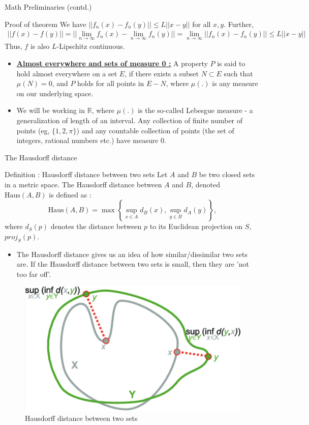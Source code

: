 \documentclass[8pt,aspectratio=169]{beamer}
\begin{document}
\begin{frame}[fragile]{Math Preliminaries (contd.)}
    \begin{block}{Proof of theorem}
        We have $||f_n(x) - f_n(y)|| \leq L||x-y||$ for all $x, y$. Further,
        \begin{align*}
            ||f(x) - f(y)|| = ||\lim_{n\to\infty} f_n(x) - \lim_{n\to\infty}f_n(y)|| = \lim_{n\to \infty}||f_n(x) - f_n(y)|| \leq L||x-y||
        \end{align*}
        Thus, $f$ is also $L$-Lipschitz continuous.
        
    \end{block}
    \begin{itemize}
        \item \textbf{\underline{Almost everywhere and sets of measure 0 :}} A property $P$ is said to hold almost everywhere on a set $E$, if there exists a subset $N \subset E$ such that $\mu(N) = 0$, and $P$ holds for all points in $E-N$, where $\mu(.)$ is any measure on our underlying space.

        \item We will be working in $\mathbb{R}$, where $\mu(.)$ is the so-called Lebesgue measure - a generalization of length of an interval. Any collection of finite number of points (eg, $\{1, 2, \pi\}$) and any countable collection of points (the set of integers, rational numbers etc.) have measure 0.
    \end{itemize}
\end{frame}

\begin{frame}[fragile]{The Hausdorff distance}
    \begin{block}{Definition : Hausdorff distance between two sets}
        Let $A$ and $B$ be two closed sets in a metric space. The Hausdorff distance between $A$ and $B$, denoted $\text{Haus}(A, B)$ is defined as : 
        \begin{equation*}
            \text{Haus}(A, B) = \max \left\{ \sup_{x \in A} d_B(x), \sup_{y \in B} d_A(y) \right \},
        \end{equation*}
        where $d_S(p)$ denotes the distance between $p$ to its Euclidean projection on $S$, $proj_S(p)$.
    \end{block}

    \begin{itemize}
        \item The Hausdorff distance gives us an idea of how similar/dissimilar two sets are. If the Hausdorff distance between two sets is small, then they are 'not too far off'.
    \end{itemize}

    \begin{figure}[h]
        \centering
        \includegraphics[width=0.25\linewidth]{haus.png}
        \caption{Hausdorff distance between two sets}
        \label{fig:enter-label}
    \end{figure}   
\end{frame}
\end{document}
